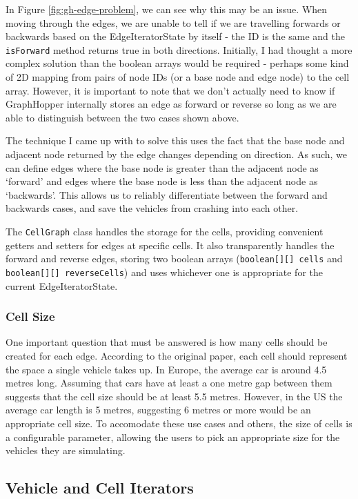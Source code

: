 \documentclass[ %
                    author={Alexander Hill},
                supervisor={Dr. Benjamin Sach},
                    degree={MEng},
                     title={MARMOSET},
                  subtitle={Multi-Agent Route Management using Online Simulation for Efficient Transportation},
                      type={research},
                      year={2016} ]{dissertation}
\begin{document}
In Figure \ref{fig:gh-edge-problem}, we can see why this may be an issue. When
moving through the edges, we are unable to tell if we are travelling forwards or
backwards based on the EdgeIteratorState by itself - the ID is the same and the
\texttt{isForward} method returns true in both directions. Initially, I had
thought a more complex solution than the boolean arrays would be required -
perhaps some kind of 2D mapping from pairs of node IDs (or a base node and edge
node) to the cell array. However, it is important to note that we don't actually
need to know if GraphHopper internally stores an edge as forward or reverse so
long as we are able to distinguish between the two cases shown above.

The technique I came up with to solve this uses the fact that the base node and
adjacent node returned by the edge changes depending on direction. As such, we
can define edges where the base node is greater than the adjacent node as
`forward' and edges where the base node is less than the adjacent node as
`backwards'. This allows us to reliably differentiate between the forward and
backwards cases, and save the vehicles from crashing into each other.

The \texttt{CellGraph} class handles the storage for the cells, providing
convenient getters and setters for edges at specific cells. It also
transparently handles the forward and reverse edges, storing two boolean arrays
(\texttt{boolean[][] cells} and \texttt{boolean[][] reverseCells}) and uses
whichever one is appropriate for the current EdgeIteratorState.

\subsubsection{Cell Size}\label{sec:cell-size}

One important question that must be answered is how many cells should be created
for each edge. According to the original paper, each cell should represent the
space a single vehicle takes up. In Europe, the average car is around 4.5 metres
long. Assuming that cars have at least a one metre gap between them suggests
that the cell size should be at least 5.5 metres. However, in the US the average car
length is 5 metres, suggesting 6 metres or more would be an appropriate cell
size. To accomodate these use cases and others, the size of cells is a
configurable parameter, allowing the users to pick an appropriate size for the
vehicles they are simulating.

\subsection{Vehicle and Cell Iterators}
\end{document}
